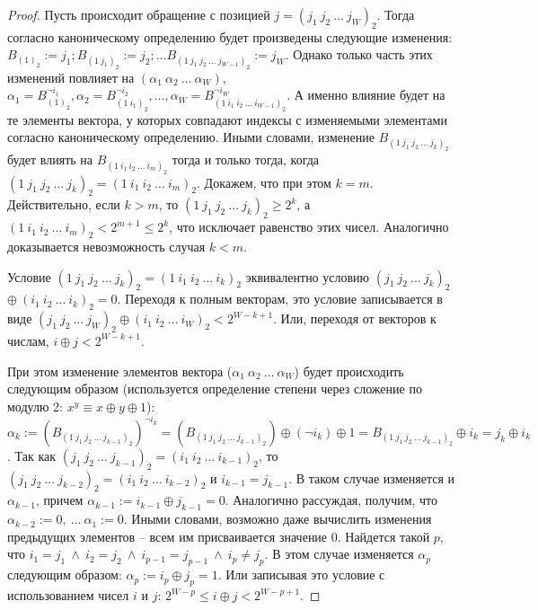 \theoremtext{\ref{thm_pseudoLRU_invariant}}{\PseudoLRUInvariant}
\begin{proof}
  Пусть происходит обращение с позицией $j = (j_1~j_2~\dots~j_W)_2$.
  Тогда согласно каноническому определению \PseudoLRU будет
  произведены следующие изменения: $B_{(1)_2} := j_1; B_{(1~j_1)_2} := j_2; \dots B_{(1~j_1~j_2~\dots~j_{W-1})_2} := j_W$. Однако только часть этих изменений повлияет на
  $(\alpha_1~\alpha_2~\dots~\alpha_W)$, $\alpha_1 = B_{(1)_2}^{\neg i_1}, \alpha_2 = B_{(1~i_1)_2}^{\neg i_2}, \dots, \alpha_W = B_{(1~i_1~i_2~\dots~i_{W-1})_2}^{\neg i_W}$. А именно влияние будет на те элементы вектора, у которых совпадают индексы с изменяемыми элементами согласно каноническому определению. Иными словами,
  изменение $B_{(1~j_1~j_2~\dots~j_k)_2}$ будет влиять на
  $B_{(1~i_1~i_2~\dots~i_m)_2}$ тогда и только тогда, когда
  $(1~j_1~j_2~\dots~j_k)_2 = (1~i_1~i_2~\dots~i_m)_2$. Докажем, что при этом $k = m$. Действительно, если $k > m$, то
  $(1~j_1~j_2~\dots~j_k)_2 \geqslant 2^k$, а $(1~i_1~i_2~\dots~i_m)_2 < 2^{m+1} \leqslant 2^k$, что исключает равенство этих чисел.
  Аналогично доказывается невозможность случая $k < m$.

  Условие $(1~j_1~j_2~\dots~j_k)_2 = (1~i_1~i_2~\dots~i_k)_2$
  эквивалентно условию $(j_1~j_2~\dots~j_k)_2$ $\oplus~(i_1~i_2~\dots~i_k)_2 = 0$. Переходя к полным векторам, это условие записывается в виде $(j_1~j_2~\dots~j_W)_2 \oplus
  (i_1~i_2~\dots~i_W)_2 < 2^{W-k+1}$. Или, переходя от векторов к
  числам, $i \oplus j < 2^{W-k+1}$.

  При этом изменение элементов вектора
  ($\alpha_1~\alpha_2~\dots~\alpha_W$) будет происходить следующим  образом (используется определение степени через сложение по модулю 2: $x^y \equiv x \oplus y \oplus 1$): $\alpha_k :=
  (B_{(1~j_1~j_2~\dots~j_{k-1})_2})^{\neg i_k} =
  (B_{(1~j_1~j_2~\dots~j_{k-1})_2}) \oplus (\neg i_k) \oplus 1 =
  B_{(1~j_1~j_2~\dots~j_{k-1})_2} \oplus i_k = j_k \oplus i_k$. Так как $(j_1~j_2~\dots~j_{k-1})_2 = (i_1~i_2~\dots~i_{k-1})_2$, то $(j_1~j_2~\dots~j_{k-2})_2 = (i_1~i_2~\dots~i_{k-2})_2$ и $i_{k-1} = j_{k-1}$. В таком случае изменяется и $\alpha_{k-1}$, причем $\alpha_{k-1} := i_{k-1} \oplus j_{k-1} = 0$. Аналогично
  рассуждая, получим, что $\alpha_{k-2} := 0,~\dots~\alpha_1 := 0$.
  Иными словами, возможно даже вычислить изменения предыдущих
  элементов -- всем им присваивается значение 0. Найдется такой $p$,
  что $i_1 = j_1~\wedge~i_2 = j_2~\wedge~i_{p-1} =
  j_{p-1}~\wedge~i_p \neq j_p$. В этом случае изменяется
  $\alpha_p$ следующим образом: $\alpha_p := i_p \oplus j_p = 1$.
  Или записывая это условие с использованием чисел $i$ и $j$: $2^{W-p} \leqslant i
  \oplus j < 2^{W-p+1}$.


\end{proof}
